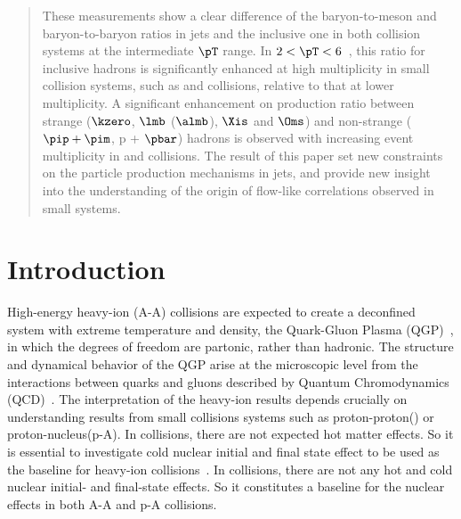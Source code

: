 \documentclass[ALICE,manyauthors]{cernphprep}
\begin{document}
\begin{titlepage}
\begin{abstract}
These measurements show a clear difference of the baryon-to-meson and baryon-to-baryon ratios in jets and the inclusive one in both collision systems at the intermediate $\pT$ range.
In $2<\pT< 6$~\GeVc, this ratio for inclusive hadrons is significantly enhanced at high multiplicity in small collision systems, such as \pp and \pPb collisions, relative to that at lower multiplicity.
A significant enhancement on production ratio between strange ($\kzero$, $\lmb$ ($\almb$), $\Xis$ and $\Oms$) and non-strange ($\pip + \pim$, p + $\pbar$) hadrons is observed with increasing event multiplicity in \pp and \pPb collisions.
The result of this paper set new constraints on the particle production mechanisms in jets, and provide new insight into the understanding of the origin of flow-like correlations observed in small systems.


\end{abstract}

\end{titlepage}

\setcounter{page}{2}


\section{Introduction}%
\label{sec:Introduction}

High-energy heavy-ion (A-A) collisions are expected to create a deconfined system with extreme temperature and density, the Quark-Gluon Plasma (QGP)~\cite{Rafelski:126179, Satz:2000bn, Shuryak:1983ni, Jacak:2012dx, Cleymans:1985wb, Bass:1998vz, BraunMunzinger:2007zz}, in which the degrees of freedom are partonic, rather than hadronic.
The structure and dynamical behavior of the QGP arise at the microscopic level from the interactions between quarks and gluons described by Quantum Chromodynamics (QCD)~\cite{Laermann:2003cv, Gupta:2011wh, Bhattacharya:2014ara}.
The interpretation of the heavy-ion results depends crucially on understanding results from small collisions systems such as proton-proton(\pp) or proton-nucleus(p-A).
In \pPb collisions, there are not expected hot matter effects.
So it is essential to investigate cold nuclear initial and final state effect to be used as the baseline for heavy-ion collisions~\cite{Salgado:2011wc, Eskola:2016oht}.
In \pp collisions, there are not any hot and cold nuclear initial- and final-state effects.
So it constitutes a baseline for the nuclear effects in both A-A and p-A collisions.
\end{document}
